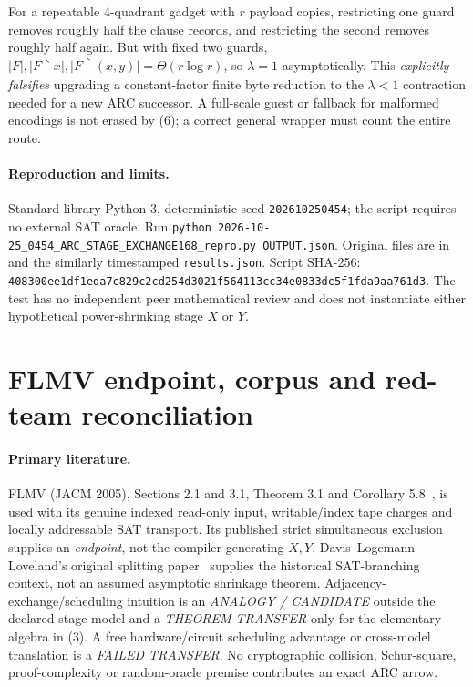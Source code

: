 \documentclass[11pt]{article}
\begin{document}
For a repeatable 4-quadrant gadget with $r$ payload copies, restricting
one guard removes roughly half the clause records, and restricting the
second removes roughly half again. But with fixed two guards,
$|F|,|F\restriction x|,|F\restriction(x,y)|=\Theta(r\log r)$,
so $\lambda=1$ asymptotically. This \emph{explicitly falsifies}
upgrading a constant-factor finite byte reduction to the
$\lambda<1$ contraction needed for a new ARC successor.
A full-scale guest or fallback for malformed encodings is not erased
by (6); a correct general wrapper must count the entire route.

\paragraph{Reproduction and limits.}
Standard-library Python 3, deterministic seed
\texttt{202610250454}; the script requires no external SAT oracle.
Run \texttt{python 2026-10-25\_0454\_ARC\_STAGE\_EXCHANGE168\_repro.py OUTPUT.json}.
Original files are in
and the similarly timestamped \texttt{results.json}.
Script SHA-256:
\texttt{408300ee1df1eda7c829c2cd254d3021f564113cc34e0833dc5f1fda9aa761d3}.
The test has no independent peer mathematical review and does not
instantiate either hypothetical power-shrinking stage $X$ or $Y$.

\section{FLMV endpoint, corpus and red-team reconciliation}
\paragraph{Primary literature.}
FLMV (JACM 2005), Sections 2.1 and 3.1,
Theorem 3.1 and Corollary 5.8~\cite{flmv}, is used with its genuine
indexed read-only input, writable/index tape charges and locally addressable
SAT transport. Its published strict simultaneous exclusion supplies an
\emph{endpoint}, not the compiler generating $X,Y$.
Davis--Logemann--Loveland's original splitting paper~\cite{dpll}
supplies the historical SAT-branching context, not an assumed
asymptotic shrinkage theorem. Adjacency-exchange/scheduling intuition is
an \emph{ANALOGY / CANDIDATE} outside the declared stage model and a
\emph{THEOREM TRANSFER} only for the elementary algebra in (3).
A free hardware/circuit scheduling advantage or cross-model translation
is a \emph{FAILED TRANSFER}. No cryptographic collision, Schur-square,
proof-complexity or random-oracle premise contributes an exact ARC arrow.
\end{document}
